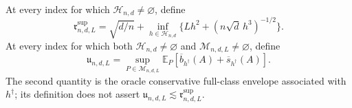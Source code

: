 At every index for which \(\mathcal H_{n,d}\ne\varnothing\), define
\[
 \mathfrak r^{\mathrm{sup}}_{n,d,L}
 =\sqrt{d/n}+\inf_{h\in\mathcal H_{n,d}}
 \{Lh^2+(n\sqrt d\,h^3)^{-1/2}\}.
\]
At every index for which both \(\mathcal H_{n,d}\ne\varnothing\) and \(\mathcal M_{n,d,L}\ne\varnothing\), define
\[
 \mathfrak u_{n,d,L}
 =\sup_{P\in\mathcal M_{n,d,L}}
 \mathbb E_P[\overline b_{h^\dagger}(A)+\overline s_{h^\dagger}(A)].
\]
The second quantity is the oracle conservative full-class envelope associated with \(h^\dagger\); its definition does not assert \(\mathfrak u_{n,d,L}\lesssim\mathfrak r^{\mathrm{sup}}_{n,d,L}\).